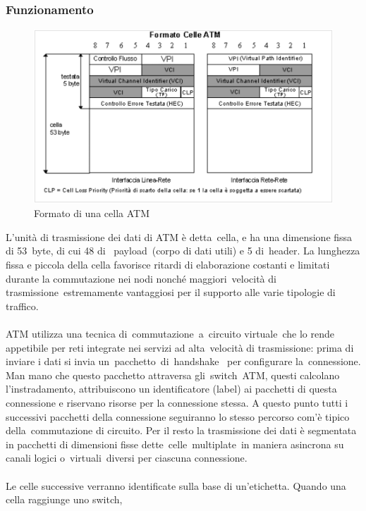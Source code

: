 \documentclass[8pt]{extarticle}
\begin{document}
\subsubsection{Funzionamento}
\begin{figure}[H]
    \center
    \includegraphics[scale=0.3]{images/ATM1.png}
    \caption{Formato di una cella ATM}\label{fig:1}
\end{figure}
\noindent
L'unità di trasmissione dei dati di ATM è detta cella, e ha una dimensione fissa di 53 byte, di cui 48 di 
payload (corpo di dati utili) e 5 di header. La lunghezza fissa e piccola della cella favorisce ritardi 
di elaborazione costanti e limitati durante la commutazione nei nodi nonché maggiori velocità di 
trasmissione estremamente vantaggiosi per il supporto alle varie tipologie di traffico.\\\\
ATM utilizza una tecnica di commutazione a circuito virtuale che lo rende appetibile per reti integrate 
nei servizi ad alta velocità di trasmissione: prima di inviare i dati si invia un pacchetto di handshake 
per configurare la connessione. Man mano che questo pacchetto attraversa gli switch ATM, questi calcolano 
l'instradamento, attribuiscono un identificatore (label) ai pacchetti di questa connessione e riservano 
risorse per la connessione stessa. A questo punto tutti i successivi pacchetti della connessione seguiranno 
lo stesso percorso com'è tipico della commutazione di circuito. Per il resto la trasmissione dei dati 
è segmentata in pacchetti di dimensioni fisse dette celle multiplate in maniera asincrona su canali logici 
o virtuali diversi per ciascuna connessione.\\\\
Le celle successive verranno identificate sulla base di un'etichetta. Quando una cella raggiunge uno switch, 
\end{document}
